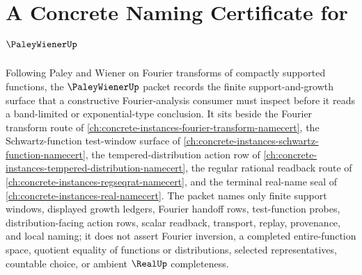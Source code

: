\chapter{A Concrete Naming Certificate for $\PaleyWienerUp$}
\label{ch:concrete-instances-paley-wiener-namecert}

Following Paley and Wiener on Fourier transforms of compactly supported functions, the $\PaleyWienerUp$ packet records the finite support-and-growth surface that a constructive Fourier-analysis consumer must inspect before it reads a band-limited or exponential-type conclusion. It sits beside the Fourier transform route of \autoref{ch:concrete-instances-fourier-transform-namecert}, the Schwartz-function test-window surface of \autoref{ch:concrete-instances-schwartz-function-namecert}, the tempered-distribution action row of \autoref{ch:concrete-instances-tempered-distribution-namecert}, the regular rational readback route of \autoref{ch:concrete-instances-regseqrat-namecert}, and the terminal real-name seal of \autoref{ch:concrete-instances-real-namecert}. The packet names only finite support windows, displayed growth ledgers, Fourier handoff rows, test-function probes, distribution-facing action rows, scalar readback, transport, replay, provenance, and local naming; it does not assert Fourier inversion, a completed entire-function space, quotient equality of functions or distributions, selected representatives, countable choice, or ambient $\RealUp$ completeness.

